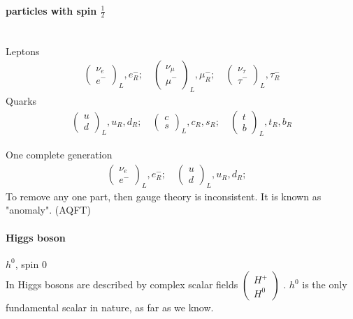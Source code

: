 \paragraph{particles with spin $ \frac{1}{2} $} \hspace{0pt} \\
Leptons
\begin{align*}
   \begin{pmatrix} \nu_e \\ e^- \end{pmatrix}_L , e^-_R ;\quad
   \begin{pmatrix} \nu_\mu \\ \mu^- \end{pmatrix}_L, \mu_R^-; \quad
   \begin{pmatrix} \nu_\tau \\ \tau^- \end{pmatrix}_L, \tau_R^- 
\end{align*}
Quarks
\begin{align*}
   \begin{pmatrix} u \\ d \end{pmatrix}_L, u_R, d_R; \quad
   \begin{pmatrix} c \\ s\end{pmatrix}_L, c_R, s_R; \quad
   \begin{pmatrix} t \\ b\end{pmatrix}_L, t_R, b_R
\end{align*}

One complete generation
\begin{align*}
   \begin{pmatrix} \nu_e \\ e^- \end{pmatrix}_L , e^-_R ;\quad 
   \begin{pmatrix} u \\ d \end{pmatrix}_L, u_R, d_R; \quad
\end{align*}
To remove any one part, then gauge theory is inconsistent. It is known as "anomaly". (AQFT)

\paragraph{Higgs boson} $h^0$, spin $0$ \\
In \sm Higgs bosons are described by complex scalar fields $\begin{pmatrix} H^+ \\ H^0 \end{pmatrix} $ . $h^0$ is the only fundamental scalar in nature, as far as we know.

